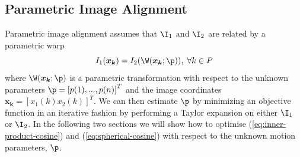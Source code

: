 \subsection{Parametric Image Alignment}\label{subsec:parametric-alignment}
Parametric image alignment assumes that $\I_1$ and $\I_2$ are related by a parametric warp
\begin{equation}\label{eq:image-warp}
   I_1 (\boldsymbol{x_k}) = I_2(\W(\boldsymbol{x_k};\p)), \; \forall{k} \in P
\end{equation}
where $\W(\boldsymbol{x_k};\p)$ is a parametric transformation with respect to the unknown parameters $\p = \left[p(1), ..., p(n)\right]^T$ and the image coordinates $\boldsymbol{x_k} = \left[x_1(k) x_2(k)\right]^T$. We can then estimate $\p$ by minimizing an objective function in an iterative fashion by performing a Taylor expansion on either $\I_1$ or $\I_2$. In the following two sections we will show how to optimise (\ref{eq:inner-product-cosine}) and (\ref{eq:spherical-cosine}) with respect to the unknown motion parameters, $\p$.